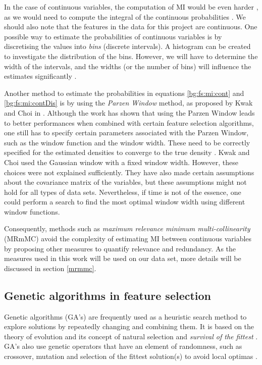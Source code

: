 \documentclass[12pt, twoside, a4paper]{report}
\begin{document}
In the case of continuous variables, the computation of MI would be even harder \cite{RefWorks:185}, as we would need to compute the integral of the continuous probabilities \cite{RefWorks:192}. We should also note that the features in the data for this project are continuous. One possible way to estimate the probabilities of continuous variables is by discretising the values into \textit{bins} (discrete intervals). A histogram can be created to investigate the distribution of the bins. However, we will have to determine the width of the intervals, and the widths (or the number of bins) will influence the estimates significantly \cite{RefWorks:186}.

Another method to estimate the probabilities in equations \ref{bg:fs:mi:cont} and \ref{bg:fs:mi:contDis} is by using the \textit{Parzen Window} method, as proposed by Kwak and Choi in \cite{RefWorks:183}. Although the work has shown that using the Parzen Window leads to better performances when combined with certain feature selection algorithms, one still has to specify certain parameters associated with the Parzen Window, such as the window function and the window width. These need to be correctly specified for the estimated densities to converge to the true density \cite{RefWorks:184}. Kwak and Choi used the Gaussian window with a fixed window width. However, these choices were not explained sufficiently. They have also made certain assumptions about the covariance matrix of the variables, but these assumptions might not hold for all types of data sets. Nevertheless, if time is not of the essence, one could perform a search to find the most optimal window width using different window functions.

Consequently, methods such as \textit{maximum relevance minimum multi-collinearity} (MRmMC) \cite{RefWorks:187} avoid the complexity of estimating MI between continuous variables by proposing other measures to quantify relevance and redundancy. As the measures used in this work will be used on our data set, more details will be discussed in section \ref{mrmmc}.

\subsection{Genetic algorithms in feature selection}

Genetic algorithms (GA's) are frequently used as a heuristic search method to explore solutions by repeatedly changing and combining them. It is based on the theory of evolution and its concept of natural selection and \textit{survival of the fittest} \cite{RefWorks:205}. GA's also use genetic operators that have an element of randomness, such as crossover, mutation and selection of the fittest solution(s) to avoid local optimas \cite{RefWorks:207}.
\end{document}
